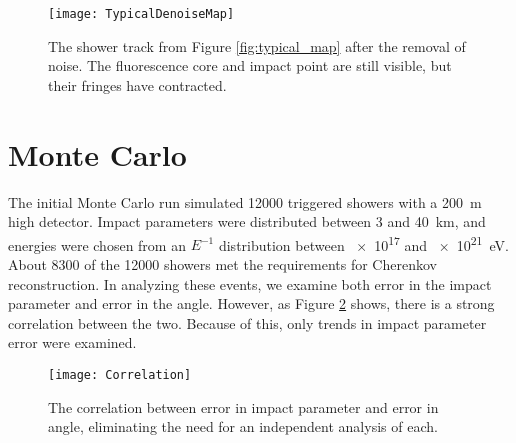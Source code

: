 \begin{figure}[!ht]
    \label{fig:typical_denoise_map}
    \centering
    \texttt{[image: TypicalDenoiseMap]}
    \caption{The shower track from Figure \ref{fig:typical_map} after the removal of noise. The fluorescence core and impact point are still visible, but their fringes have contracted.}
\end{figure}

\section{Monte Carlo} \label{sec:mc_results}

The initial Monte Carlo run simulated \num{12000} triggered showers with a \SI{200}{m} high detector. Impact parameters were distributed between \num{3} and \SI{40}{km}, and energies were chosen from an $E^{-1}$ distribution between \num{e17} and \SI{e21}{eV}. About \num{8300} of the \num{12000} showers met the requirements for Cherenkov reconstruction. In analyzing these events, we examine both error in the impact parameter and error in the angle. However, as Figure \ref{fig:correlation} shows, there is a strong correlation between the two. Because of this, only trends in impact parameter error were examined.

\begin{figure}[p]
    \label{fig:correlation}
    \centering
    \texttt{[image: Correlation]}
    \caption{The correlation between error in impact parameter and error in angle, eliminating the need for an independent analysis of each.}
\end{figure}

